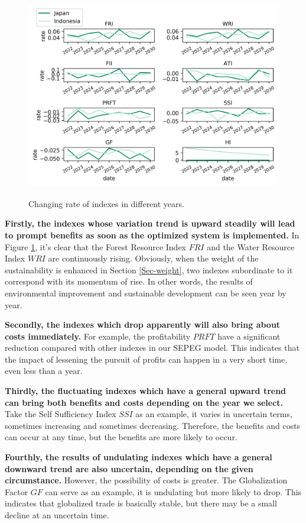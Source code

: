 \documentclass{mcmthesis}
\begin{document}
\begin{figure}[H]
	\centering
	\includegraphics[height=9cm]{line.png} 
	\caption{Changing rate of indexes in different years.}
	\label{fig:line}
\end{figure}

\textbf{Firstly, the indexes whose variation trend is upward steadily will lead to prompt benefits as soon as the optimized system is implemented. }In Figure \ref{fig:line}, it's clear that the Forest Resource Index $FRI$ and the Water Resource Index $WRI$ are continuously rising. Obviously, when the weight of the sustainability is enhanced in Section \ref{Sec-weight}, two indexes subordinate to it correspond with its momentum of rise. In other words, the results of environmental improvement and sustainable development can be seen year by year.

\textbf{Secondly, the indexes which drop apparently will also bring about costs immediately.} For example, the profitability $PRFT$ have a significant reduction compared with other indexes in our SEPEG model. This indicates that the impact of lessening the pursuit of profits can happen in a very short time, even less than a year.

\textbf{Thirdly, the fluctuating indexes which have a general upward trend can bring both benefits and costs depending on the year we select. }Take the Self Sufficiency Index $SSI$ as an example, it varies in uncertain terms, sometimes increasing and sometimes decreasing. Therefore, the benefits and costs can occur at any time, but the benefits are more likely to occur.

\textbf{Fourthly, the results of undulating indexes which have a general downward trend are also uncertain, depending on the given circumstance. }However, the possibility of costs is greater. The Globalization Factor $GF$ can serve as an example, it is undulating but more likely to drop. This indicates that globalized trade is basically stable, but there may be a small decline at an uncertain time.
\end{document}
